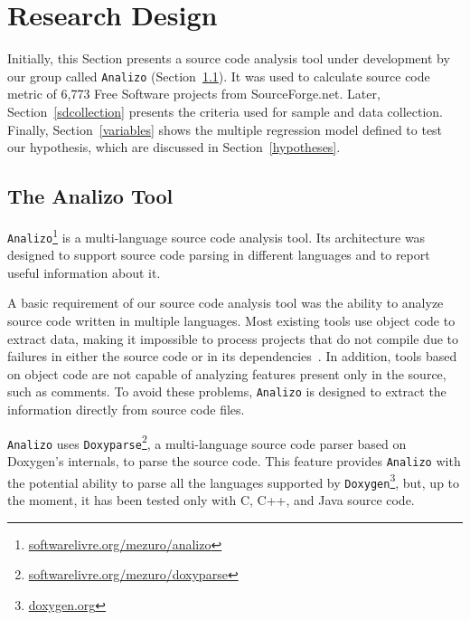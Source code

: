 \documentclass[conference]{IEEEtran}
\begin{document}
\section{Research Design} 
\label{researchDesign}

Initially, this Section presents a source code analysis tool under development by our 
group called \texttt{Analizo} (Section~\ref{analizo}). It was used 
to calculate source code metric of 6,773 Free Software projects from SourceForge.net. 
%
Later, Section~\ref{sdcollection} presents the criteria used for sample and data collection. 
%
Finally, Section~\ref{variables} shows the multiple regression model defined 
to test our hypothesis, which are discussed in Section~\ref{hypotheses}.

\subsection{The Analizo Tool}
\label{analizo}

\texttt{Analizo}\footnote{\url{softwarelivre.org/mezuro/analizo}} is a 
multi-language source code analysis tool.
%
Its architecture was designed to support source code parsing in different
languages and to report useful information about it.

A basic requirement of our source code analysis tool was the ability to analyze
source code written in multiple languages.
%
Most existing tools use object code to extract data, making it impossible to process
projects that do not compile due to failures in either the source code or
in its dependencies~\cite{hassan05}.
%
In addition, tools based on object code are not
capable of analyzing features present only in the source, such as comments.
%
To avoid these problems, \texttt{Analizo} is designed to extract the information
directly from source code files.

\texttt{Analizo} uses \texttt{Doxyparse}\footnote{\url{softwarelivre.org/mezuro/doxyparse}},
a multi-language source code parser based on Doxygen's internals, to parse the source code.
%
This feature provides \texttt{Analizo} with the potential ability to parse all 
the languages supported by \texttt{Doxygen}\footnote{\url{doxygen.org}}, but, 
up to the moment, it has been tested only with C, C++, and Java source code.
\end{document}
